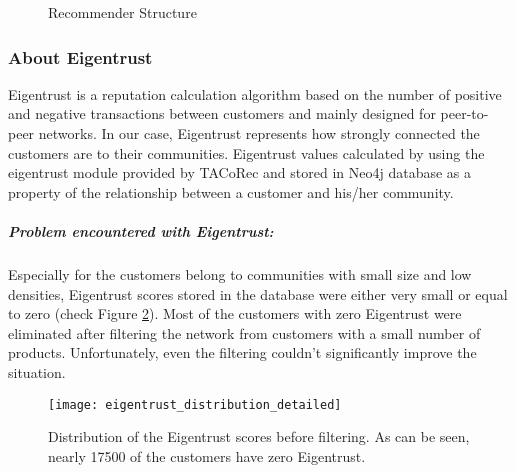 \label{eigentrust_section}
	\begin{figure}[H]
		\centering
		\caption{Recommender Structure}
		\label{fig:eigentrust_structure}
	\end{figure}
	\subsubsection{About Eigentrust} \label{about_eigentrust}
	Eigentrust\cite{Eigentrust} is a reputation calculation algorithm based on the number of positive and negative transactions between customers and mainly designed for peer-to-peer networks. In our case, Eigentrust represents how strongly connected the customers are to their communities. Eigentrust values calculated by using the eigentrust module provided by TACoRec and stored in Neo4j database as a property of the relationship between a customer and his/her community. 
	\subparagraph{Problem encountered with Eigentrust:}
	Especially for the customers belong to communities with small size and low densities, Eigentrust scores stored in the database were either very small or equal to zero (check Figure \ref{fig:eigentrust_distribution_figure}). Most of the customers with zero Eigentrust were eliminated after filtering the network from customers with a small number of products. Unfortunately, even the filtering couldn't significantly improve the situation.
	\begin{figure}[H]
		\centering
		\texttt{[image: eigentrust\_distribution\_detailed]}
		\caption{Distribution of the Eigentrust scores before filtering. As can be seen, nearly 17500 of the customers have zero Eigentrust.}
		\label{fig:eigentrust_distribution_figure}
	\end{figure}

